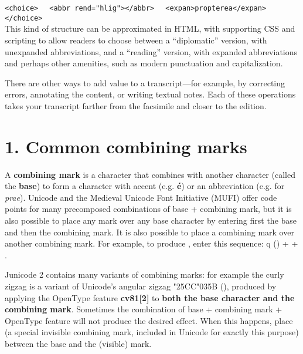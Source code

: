 \noindent\verb!<choice>!\newline
\verb!  <abbr rend="hlig">!\textrm{}\verb!</abbr>!\newline
\verb!  <expan>propterea</expan>!\newline
\verb!</choice>!\\[1ex]

\noindent This kind of structure can be approximated in HTML, with supporting CSS and scripting to allow readers to choose between
a ``diplomatic'' version, with unexpanded abbreviations, and a ``reading'' version, with expanded abbreviations and
perhaps other amenities, such as modern punctuation and capitalization.

There are other ways to add value to a transcript---for example, by correcting errors, annotating the content, or
writing textual notes. Each of these operations takes your transcript farther from the facsimile and closer to the
edition.

\section[1. Common combining marks]{1. Common combining marks}
A \textbf{combining mark} is a character that combines with another character (called the \textbf{base}) to form a
character with accent (e.g. \textbf{\'e}) or an abbreviation (e.g. \textbf{} for \textit{prae}).
Unicode and the Medieval Unicode Font Initiative (MUFI) offer code points for many precomposed combinations of base +
combining mark, but it is also possible to place any mark over any base character by entering first the base and then
the combining mark. It is also possible to place a combining mark over another combining mark. For example, to produce
\textbf{}, enter this sequence: q () +  + .

Junicode 2 contains many variants of combining marks: for example the curly zigzag  is a variant of
Unicode's angular zigzag {\char"25CC\char"035B} (), produced by applying the OpenType feature \textbf{cv81[2]} to \textbf{both the base character and the combining mark}. Sometimes the combination of base + combining mark + OpenType
feature will not produce the desired effect. When this happens, place  (a special invisible combining mark,
included in Unicode for exactly this purpose) between the base and the (visible) mark.\\

